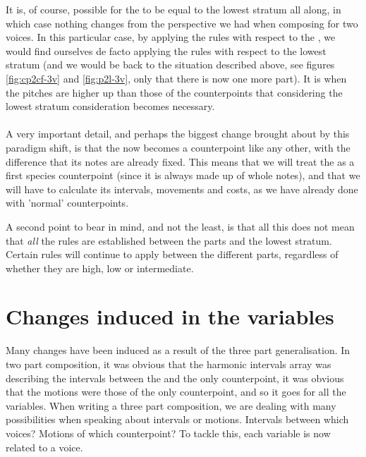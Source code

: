 It is, of course, possible for the \cfs to be equal to the lowest stratum all along, in which case nothing changes from the perspective we had when composing for two voices. In this particular case, by applying the rules with respect to the \cf, we would find ourselves de facto applying the rules with respect to the lowest stratum (and we would be back to the situation described above, see figures \ref{fig:cp2cf-3v} and \ref{fig:p2l-3v}, only that there is now one more part). It is when the \cfs pitches are higher up than those of the counterpoints that considering the lowest stratum consideration becomes necessary.

\paragraph{}
A very important detail, and perhaps the biggest change brought about by this paradigm shift, is that the \cfs now becomes a counterpoint like any other, with the difference that its notes are already fixed. This means that we will treat the \cfs as a first species counterpoint (since it is always made up of whole notes), and that we will have to calculate its intervals, movements and costs, as we have already done with 'normal' counterpoints.

A second point to bear in mind, and not the least, is that all this does not mean that \textit{all} the rules are established between the parts and the lowest stratum. Certain rules will continue to apply between the different parts, regardless of whether they are high, low or intermediate.

\section{Changes induced in the variables} \label{section:changes induced}


Many changes have been induced as a result of the three part generalisation. In two part composition, it was obvious that the harmonic intervals array was describing the intervals between the \cfs and the only counterpoint, it was obvious that the motions were those of the only counterpoint, and so it goes for all the variables. When writing a three part composition, we are dealing with many possibilities when speaking about intervals or motions. Intervals between which voices? Motions of which counterpoint? To tackle this, each variable is now related to a voice.

